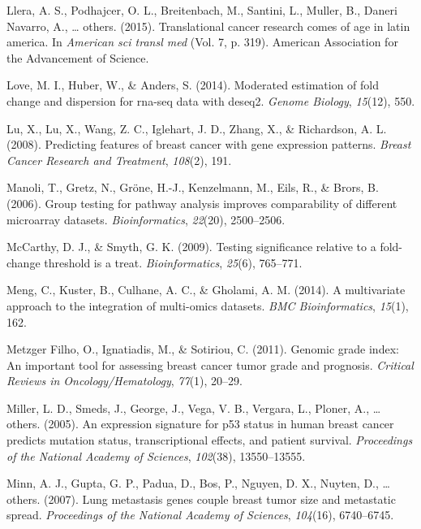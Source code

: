 \documentclass[12pt,twoside]{reedthesis}
\begin{document}
\leavevmode\hypertarget{ref-llera2015translational}{}%
Llera, A. S., Podhajcer, O. L., Breitenbach, M., Santini, L., Muller, B., Daneri Navarro, A., \ldots{} others. (2015). Translational cancer research comes of age in latin america. In \emph{American sci transl med} (Vol. 7, p. 319). American Association for the Advancement of Science.

\leavevmode\hypertarget{ref-love2014moderated}{}%
Love, M. I., Huber, W., \& Anders, S. (2014). Moderated estimation of fold change and dispersion for rna-seq data with deseq2. \emph{Genome Biology}, \emph{15}(12), 550.

\leavevmode\hypertarget{ref-lu2008predicting}{}%
Lu, X., Lu, X., Wang, Z. C., Iglehart, J. D., Zhang, X., \& Richardson, A. L. (2008). Predicting features of breast cancer with gene expression patterns. \emph{Breast Cancer Research and Treatment}, \emph{108}(2), 191.

\leavevmode\hypertarget{ref-manoli2006group}{}%
Manoli, T., Gretz, N., Gröne, H.-J., Kenzelmann, M., Eils, R., \& Brors, B. (2006). Group testing for pathway analysis improves comparability of different microarray datasets. \emph{Bioinformatics}, \emph{22}(20), 2500--2506.

\leavevmode\hypertarget{ref-mccarthy2009testing}{}%
McCarthy, D. J., \& Smyth, G. K. (2009). Testing significance relative to a fold-change threshold is a treat. \emph{Bioinformatics}, \emph{25}(6), 765--771.

\leavevmode\hypertarget{ref-meng2014multivariate}{}%
Meng, C., Kuster, B., Culhane, A. C., \& Gholami, A. M. (2014). A multivariate approach to the integration of multi-omics datasets. \emph{BMC Bioinformatics}, \emph{15}(1), 162.

\leavevmode\hypertarget{ref-metzger2011genomic}{}%
Metzger Filho, O., Ignatiadis, M., \& Sotiriou, C. (2011). Genomic grade index: An important tool for assessing breast cancer tumor grade and prognosis. \emph{Critical Reviews in Oncology/Hematology}, \emph{77}(1), 20--29.

\leavevmode\hypertarget{ref-miller2005expression}{}%
Miller, L. D., Smeds, J., George, J., Vega, V. B., Vergara, L., Ploner, A., \ldots{} others. (2005). An expression signature for p53 status in human breast cancer predicts mutation status, transcriptional effects, and patient survival. \emph{Proceedings of the National Academy of Sciences}, \emph{102}(38), 13550--13555.

\leavevmode\hypertarget{ref-minn2007lung}{}%
Minn, A. J., Gupta, G. P., Padua, D., Bos, P., Nguyen, D. X., Nuyten, D., \ldots{} others. (2007). Lung metastasis genes couple breast tumor size and metastatic spread. \emph{Proceedings of the National Academy of Sciences}, \emph{104}(16), 6740--6745.
\end{document}
